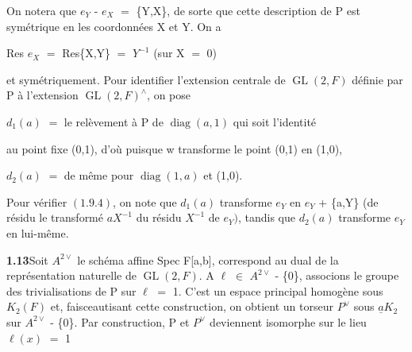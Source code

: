 \documentclass[10pt,a4paper]{article}
\begin{document}
\par On notera que $e_Y$ - $e_X$ $=$ \{Y,X\}, de sorte que cette description de P est symétrique en les coordonnées X et Y. On a\par
\par\smallskip\begin{center}\begin{minipage}{0.96\textwidth}\centering
Res $e_X$ $=$ Res\{X,Y\} $=$ $Y^{-1}$ (sur X $=$ 0)
\end{minipage}\end{center}\smallskip
\par et symétriquement. Pour identifier l'extension centrale de $\operatorname{GL}(2,F)$ définie par P à l'extension $\operatorname{GL}(2,F)^\wedge{}$, on pose\par
\par\smallskip\begin{center}\begin{minipage}{0.96\textwidth}\centering
$d_1(a)$ $=$ le relèvement à P de $\operatorname{diag}(a,1)$ qui soit l'identité
\end{minipage}\end{center}\smallskip
\par au point fixe (0,1), d'où puisque w transforme le point (0,1) en (1,0),\par
\par\smallskip\begin{center}\begin{minipage}{0.96\textwidth}\centering
$d_2(a)$ $=$ de même pour $\operatorname{diag}(1,a)$ et (1,0).
\end{minipage}\end{center}\smallskip
\par Pour vérifier $(1.9.4)$, on note que $d_1(a)$ transforme $e_Y$ en $e_Y$ + \{a,Y\} (de résidu le transformé $aX^{-1}$ du résidu $X^{-1}$ de $e_Y)$, tandis que $d_2(a)$ transforme $e_Y$ en lui-même.\par
\par\noindent\textbf{1.13}\quad Soit $A^{2\vee{}}$ le schéma affine Spec F[a,b], correspond au dual de la représentation naturelle de $\operatorname{GL}(2,F)$. A $\ell{}$ $\in{}$ $A^{2\vee{}}$ - \{0\}, associons le groupe des trivialisations de P sur $\ell{}$ $=$ 1. C'est un espace principal homogène sous $K_2(F)$ et, faisceautisant cette construction, on obtient un torseur $P^\vee{}$ sous $\underline{a}K_2$ sur $A^{2\vee{}}$ - \{0\}. Par construction, P et $P^\vee{}$ deviennent isomorphe sur le lieu $\ell{}(x)$ $=$ 1\par
\end{document}
